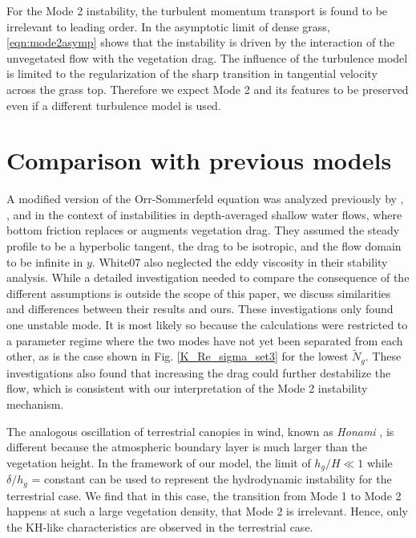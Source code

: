 \documentclass[12pt]{report}   %
\newcommand{\hg}{h_g}
\newcommand{\Ndg}{\tilde{N}_g}
\begin{document}
For the Mode 2 instability, the turbulent momentum transport is found to be irrelevant to leading order.
In the asymptotic limit of dense grass, \eqref{eqn:mode2asymp} shows that the instability is driven by the interaction of the unvegetated flow with the vegetation drag.
The influence of the turbulence model is limited to the regularization of the sharp transition in tangential velocity across the grass top.
Therefore we expect Mode 2 and its features to be preserved even if a different turbulence model is used.
\section{Comparison with previous models}

A modified version of the Orr-Sommerfeld equation was analyzed previously by \cite{Chu91}, \cite{Chen97}, and \cite{White07} in the context of instabilities in depth-averaged shallow water flows, where bottom friction replaces or augments vegetation drag.
They assumed the steady profile to be a hyperbolic tangent, the drag to be isotropic, and the flow domain to be infinite in $y$.
{White07} also neglected the eddy viscosity in their stability analysis.
While a detailed investigation needed to compare the consequence of the different assumptions is outside the scope of this paper, we discuss similarities and differences between their results and ours.
These investigations only found one unstable mode.
It is most likely so because the calculations were restricted to a parameter regime where the two modes have not yet been separated from each other, as is the case shown in Fig. \ref{K_Re_sigma_set3} for the lowest $\Ndg$.
These investigations also found that increasing the drag could further destabilize the flow, which is consistent with our interpretation of the Mode 2 instability mechanism.

The analogous oscillation of terrestrial canopies in wind, known as \textit{Honami} \cite{Inoue56,Raupach96}, is different because the atmospheric boundary layer is much larger than the vegetation height.
In the framework of our model, the limit of $\hg/H \ll 1$ while $\delta/\hg$ = constant can be used to represent the hydrodynamic instability for the terrestrial case.
We find that in this case, the transition from Mode 1 to Mode 2 happens at such a large vegetation density, that Mode 2 is irrelevant. 
Hence, only the KH-like characteristics are observed in the terrestrial case. 
\end{document}
